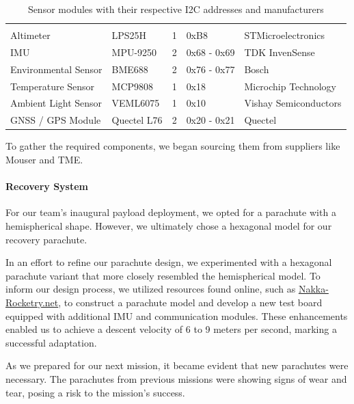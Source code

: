 \begin{table}[htbp]
\centering
{} %
\begin{tabular}{>{\centering\arraybackslash}m{4cm}>{\centering\arraybackslash}llll}
\hline
\rowcolor{DeepSkyBlue4}
\textbf{\color{white!50}{Module}} & \textbf{\color{white}{Sensor}} & \textbf{\color{white}{I2C Bus}} & \textbf{\color{white}{I2C Address}} & \textbf{\color{white}{Manufacturer}} \\
Altimeter & LPS25H & 1 & 0xB8 &  STMicroelectronics \\
IMU & MPU-9250 & 2 & 0x68 - 0x69 & TDK InvenSense \\
Environmental Sensor & BME688 & 2 & 0x76 - 0x77 & Bosch \\
Temperature Sensor & MCP9808 & 1 & 0x18 & Microchip Technology \\
Ambient Light Sensor & VEML6075 & 1 & 0x10 & Vishay Semiconductors \\
GNSS / GPS Module & Quectel L76 & 2 & 0x20 - 0x21 & Quectel \\
\end{tabular}
\caption{Sensor modules with their respective I2C addresses and manufacturers}

\end{table}
\label{tab:sensors}

To gather the required components, we began sourcing them from suppliers like Mouser and TME.


\paragraph*{Recovery System}
For our team's inaugural payload deployment, we opted for a parachute with a hemispherical shape. However, we ultimately chose a hexagonal model for our recovery parachute.

In an effort to refine our parachute design, we experimented with a hexagonal parachute variant that more closely resembled the hemispherical model. To inform our design process, we utilized resources found online, such as \href{https://www.nakka-rocketry.net/paracon.html}{Nakka-Rocketry.net}, to construct a parachute model and develop a new test board equipped with additional IMU and communication modules. These enhancements enabled us to achieve a descent velocity of 6 to 9 meters per second, marking a successful adaptation.

As we prepared for our next mission, it became evident that new parachutes were necessary. The parachutes from previous missions were showing signs of wear and tear, posing a risk to the mission's success.

